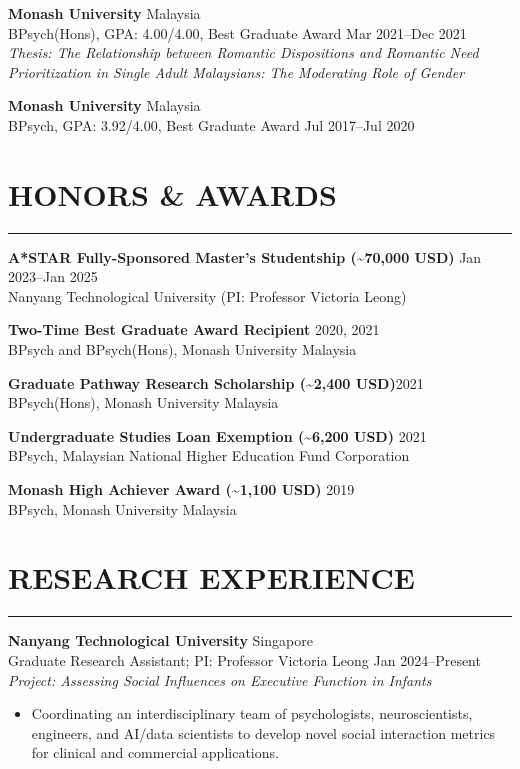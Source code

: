 \documentclass[11pt]{article}
\begin{document}
\textbf{Monash University} \hfill Malaysia \\
BPsych(Hons), GPA: 4.00/4.00, Best Graduate Award \hfill Mar 2021--Dec 2021\\
\textit{Thesis: The Relationship between Romantic Dispositions and Romantic Need Prioritization in Single Adult Malaysians: The Moderating Role of Gender}

\textbf{Monash University} \hfill Malaysia \\
BPsych, GPA: 3.92/4.00, Best Graduate Award \hfill Jul 2017--Jul 2020

\section*{HONORS \& AWARDS}
\hrule
\textbf{A*STAR Fully-Sponsored Master's Studentship (\textasciitilde{}70,000 USD)} \hfill Jan 2023--Jan 2025\\ 
Nanyang Technological University (PI: Professor Victoria Leong)

\textbf{Two-Time Best Graduate Award Recipient} \hfill 2020, 2021\\ 
BPsych and BPsych(Hons), Monash University Malaysia

\textbf{Graduate Pathway Research Scholarship (\textasciitilde{}2,400 USD)}\hfill 2021\\ 
BPsych(Hons), Monash University Malaysia

\textbf{Undergraduate Studies Loan Exemption (\textasciitilde{}6,200 USD)} \hfill 2021\\ 
BPsych, Malaysian National Higher Education Fund Corporation

\textbf{Monash High Achiever Award (\textasciitilde{}1,100 USD)} \hfill 2019\\ 
BPsych, Monash University Malaysia

\section*{RESEARCH EXPERIENCE}
\hrule
\textbf{Nanyang Technological University} \hfill Singapore \\
Graduate Research Assistant; PI: Professor Victoria Leong \hfill Jan 2024--Present \\
\textit{Project: Assessing Social Influences on Executive Function in Infants}
\begin{itemize}[leftmargin=1.2cm]
    \item Coordinating an interdisciplinary team of psychologists, neuroscientists, engineers, and AI/data scientists to develop novel social interaction metrics for clinical and commercial applications.
\end{itemize}
\end{document}
